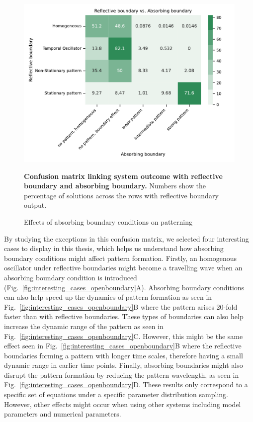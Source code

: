 \begin{figure}[H] %
    \centering
    \begin{adjustbox}{center}
        \includegraphics[width=1\textwidth]{chapters/Chapter 1/nogrowth_openboundary_confusion_variant0-11-12} %
    \end{adjustbox}
    \caption{\textbf{Confusion matrix linking system outcome with reflective boundary and absorbing boundary.} Numbers show the percentage of solutions across the rows with reflective boundary output.}
    \caption{Effects of absorbing boundary conditions on patterning}
    \label{fig:nogrowth_openboundary_confusion_variant0} %
\end{figure}

By studying the exceptions in this confusion matrix, we selected four interesting cases to display in this thesis, which helps us understand how absorbing boundary conditions might affect pattern formation.
Firstly, an homogenous oscillator under reflective boundaries might become a travelling wave when an absorbing boundary condition is introduced (Fig.~\ref{fig:interesting_cases_openboundary}A).
Absorbing boundary conditions can also help speed up the dynamics of pattern formation as seen in Fig.~\ref{fig:interesting_cases_openboundary}B where the pattern arises 20-fold faster than with reflective boundaries.
These types of boundaries can also help increase the dynamic range of the pattern as seen in Fig.~\ref{fig:interesting_cases_openboundary}C.
However, this might be the same effect seen in Fig.~\ref{fig:interesting_cases_openboundary}B where the reflective boundaries forming a pattern with longer time scales, therefore having a small dynamic range in earlier time points.
Finally, absorbing boundaries might also disrupt the pattern formation by reducing the pattern wavelength, as seen in Fig.~\ref{fig:interesting_cases_openboundary}D.
These results only correspond to a specific set of equations under a specific parameter distribution sampling.
However, other effects might occur when using other systems including model parameters and numerical parameters.

